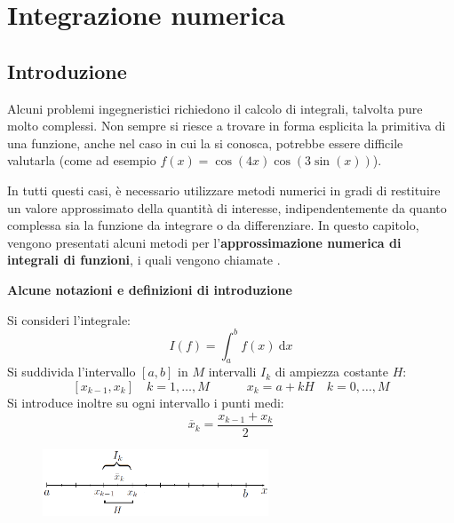 \section{Integrazione numerica}

\subsection{Introduzione}

Alcuni problemi ingegneristici richiedono il calcolo di integrali, talvolta pure molto complessi. Non sempre si riesce a trovare in forma esplicita la primitiva di una funzione, anche nel caso in cui la si conosca, potrebbe essere difficile valutarla (come ad esempio $f\left(x\right) = \cos\left(4x\right) \cos\left(3\sin\left(x\right)\right)$).

\highspace
In tutti questi casi, è necessario utilizzare metodi numerici in gradi di restituire un valore approssimato della quantità di interesse, indipendentemente da quanto complessa sia la funzione da integrare o da differenziare. In questo capitolo, vengono presentati alcuni metodi per l'\textbf{approssimazione numerica di integrali di funzioni}, i quali vengono chiamate .

\highspace
\begin{flushleft}
	\textcolor{Green3}{ \textbf{Alcune notazioni e definizioni di introduzione}}
\end{flushleft}
Si consideri l'integrale:
\begin{equation}\label{eq: formula di quadratura base}
	I\left(f\right) = \int_{a}^{b} f\left(x\right) \:\mathrm{d}x
\end{equation}
Si suddivida l'intervallo $\left[a,b\right]$ in $M$ intervalli $I_{k}$ di ampiezza costante $H$:
\begin{equation*}
	\left[x_{k-1}, x_{k}\right] \hspace{1em} k = 1, \dots, M \hspace{3em}
	x_{k} = a + kH \hspace{1em} k = 0, \dots, M
\end{equation*}
Si introduce inoltre su ogni intervallo i punti medi:
\begin{equation*}
	\overline{x}_{k} = \dfrac{x_{k-1} + x_{k}}{2}
\end{equation*}
\begin{figure}[!htp]
	\centering
	\includegraphics[width=0.6\textwidth]{img/formule-di-quadratura-1.png}
\end{figure}

